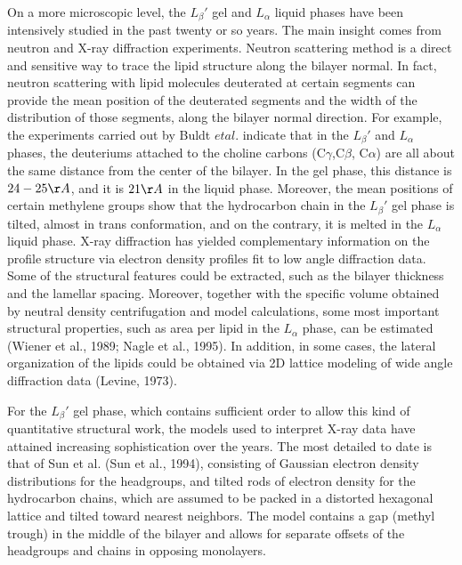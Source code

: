 On a more microscopic level, the $L_\beta'$ gel and $L_\alpha$ liquid phases
have been intensively studied in the past twenty or so years. 
The main insight comes from neutron and X-ray diffraction experiments.
Neutron scattering  method is a direct and sensitive way
to trace the lipid structure along the bilayer normal.
In fact, neutron scattering with lipid molecules deuterated
at certain segments  can provide the mean position
of the deuterated segments and the width of the distribution of
those segments, along the bilayer normal direction.
For example, the experiments carried out by Buldt $et al.$ indicate
that in the $L_\beta'$ and $L_\alpha$ phases, the deuteriums attached
to the choline carbons (C$\gamma$,C$\beta$, C$\alpha$) are all about
the same distance from the center of the bilayer. In the gel phase,
this distance is $24-25\AA$, and it is $21\AA$ in the liquid phase.
Moreover, the mean positions of certain methylene groups show
that the hydrocarbon chain in the $L_\beta'$ gel phase is tilted,
almost in trans conformation, and on the contrary, it is melted in
the $L_\alpha$ liquid phase.
X-ray diffraction has yielded complementary information
on the profile structure via electron density profiles fit to low angle
diffraction data. 
Some of the structural features could be extracted,
such as the bilayer thickness and the lamellar spacing.
Moreover, together with the specific volume obtained by neutral
density centrifugation and model calculations, some most important 
structural properties, such as area per lipid in the $L_\alpha$ phase, 
can be estimated (Wiener et al., 1989; Nagle et al., 1995).
In addition, in some cases,
the lateral organization of the lipids could be obtained via
2D lattice modeling of wide angle diffraction data (Levine, 1973).

For the $L_\beta'$ gel phase, which contains sufficient order to allow
this kind of quantitative structural work, 
the models used to interpret X-ray data have attained
increasing sophistication over the years.  The most detailed to
date is that of Sun et al. (Sun et al., 1994), consisting of Gaussian electron
density distributions for the headgroups, and tilted rods of electron
density for the hydrocarbon chains, which are assumed to be packed in
a distorted hexagonal lattice and tilted toward nearest neighbors.
The model contains a gap (methyl trough) in the middle of the bilayer
and allows for separate offsets of the headgroups and chains in
opposing monolayers.


